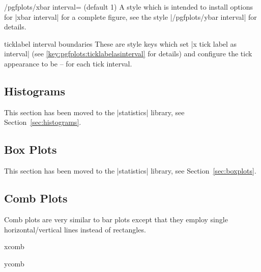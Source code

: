 {\begin{stylekey}{/pgfplots/xbar interval= (default 1)}
    A style which is intended to install options for |xbar interval| for a
    complete figure, see the style |/pgfplots/ybar interval| for details.
\end{stylekey}

\begin{pgfplotsxykey}{\x ticklabel interval boundaries}
    These are style keys which set |x tick label as interval| (see
    \ref{key:pgfplots:ticklabelasinterval} for details) and configure
    the tick appearance to be  --  for each tick
    interval.
\end{pgfplotsxykey}


\subsection{Histograms}

This section has been moved to the |statistics| library, see
Section~\ref{sec:histograms}.

\subsection{Box Plots}

This section has been moved to the |statistics| library, see
Section~\ref{sec:boxplots}.

\subsection{Comb Plots}

Comb plots are very similar to bar plots except that they employ single
horizontal/vertical lines instead of rectangles.

\begin{plottype}{xcomb}
\begin{codeexample}[]
\end{codeexample}
\end{plottype}

\begin{plottype}{ycomb}
\begin{codeexample}[]
\end{codeexample}
\end{plottype}


}

